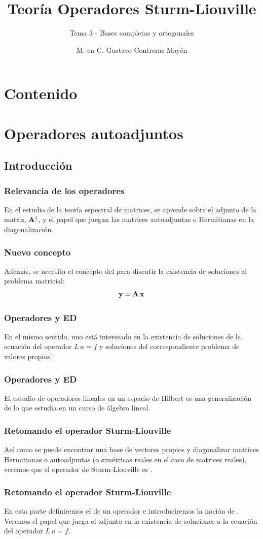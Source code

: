 \documentclass[12pt]{beamer}
\date{}
\title{\large{Teoría Operadores Sturm-Liouville}}
\subtitle{Tema 3 - Bases completas y ortogonales}
\author{M. en C. Gustavo Contreras Mayén}
\begin{document}
\maketitle
\fontsize{14}{14}\selectfont
{}

\section*{Contenido}

\section{Operadores autoadjuntos}
\subsection{Introducción}

\begin{frame}
\frametitle{Relevancia de los operadores}
En el estudio de la teoría espectral de matrices, se aprende sobre el adjunto de la matriz, $\vb{A}^{\dagger}$, y el papel que juegan las matrices autoadjuntas o Hermitianas en la diagonalización.
\end{frame}
\begin{frame}
\frametitle{Nuevo concepto}
Además, se necesita el concepto del  para discutir la existencia de soluciones al problema matricial:
\begin{align*}
\vb{y} = \vb{A} \, \vb{x}
\end{align*}
\end{frame}
\begin{frame}
\frametitle{Operadores y ED}
En el mismo sentido, uno está interesado en la existencia de soluciones de la ecuación del operador $L \, u = f$ y soluciones del correspondiente problema de valores propios.
\end{frame}
\begin{frame}
\frametitle{Operadores y ED}
El estudio de operadores lineales en un espacio de Hilbert es una generalización de lo que estudia en un curso de álgebra lineal.
\end{frame}
\begin{frame}
\frametitle{Retomando el operador Sturm-Liouville}
Así como se puede encontrar una base de vectores propios y diagonalizar matrices Hermitianas o autoadjuntas (o simétricas reales en el caso de matrices reales), veremos que el operador de Sturm-Liouville es .
\end{frame}
\begin{frame}
\frametitle{Retomando el operador Sturm-Liouville}    
En esta parte definiremos el  de un operador e introduciremos la noción de .
\\
\bigskip
\pause
Veremos el papel que juega el adjunto en la existencia de soluciones a la ecuación del operador $L \, u = f$.
\end{frame}
\end{document}
